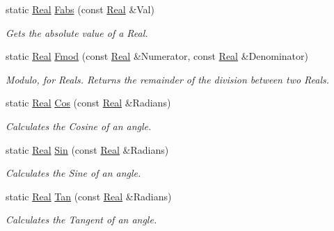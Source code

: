 \begin{DoxyCompactItemize}
static \hyperlink{namespacephys_af7eb897198d265b8e868f45240230d5f}{Real} \hyperlink{classphys_1_1MathTool_a8304f680a03ec49a284564ad4a1d21f8}{Fabs} (const \hyperlink{namespacephys_af7eb897198d265b8e868f45240230d5f}{Real} \&Val)
\begin{DoxyCompactList}\small\item\em Gets the absolute value of a Real. \item\end{DoxyCompactList}\item 
static \hyperlink{namespacephys_af7eb897198d265b8e868f45240230d5f}{Real} \hyperlink{classphys_1_1MathTool_ad1d294ffae4b40b13b745f65e27372c1}{Fmod} (const \hyperlink{namespacephys_af7eb897198d265b8e868f45240230d5f}{Real} \&Numerator, const \hyperlink{namespacephys_af7eb897198d265b8e868f45240230d5f}{Real} \&Denominator)
\begin{DoxyCompactList}\small\item\em Modulo, for Reals. Returns the remainder of the division between two Reals. \item\end{DoxyCompactList}\item 
static \hyperlink{namespacephys_af7eb897198d265b8e868f45240230d5f}{Real} \hyperlink{classphys_1_1MathTool_ac6f9436baacafe1894f71728f11e2f58}{Cos} (const \hyperlink{namespacephys_af7eb897198d265b8e868f45240230d5f}{Real} \&Radians)
\begin{DoxyCompactList}\small\item\em Calculates the Cosine of an angle. \item\end{DoxyCompactList}\item 
static \hyperlink{namespacephys_af7eb897198d265b8e868f45240230d5f}{Real} \hyperlink{classphys_1_1MathTool_a91b41510f0788d9304ddd112236356f9}{Sin} (const \hyperlink{namespacephys_af7eb897198d265b8e868f45240230d5f}{Real} \&Radians)
\begin{DoxyCompactList}\small\item\em Calculates the Sine of an angle. \item\end{DoxyCompactList}\item 
static \hyperlink{namespacephys_af7eb897198d265b8e868f45240230d5f}{Real} \hyperlink{classphys_1_1MathTool_a8d5e4afe0e8e014f61bfefba2ffc0ede}{Tan} (const \hyperlink{namespacephys_af7eb897198d265b8e868f45240230d5f}{Real} \&Radians)
\begin{DoxyCompactList}\small\item\em Calculates the Tangent of an angle. \item\end{DoxyCompactList}\item 

\end{DoxyCompactItemize}
